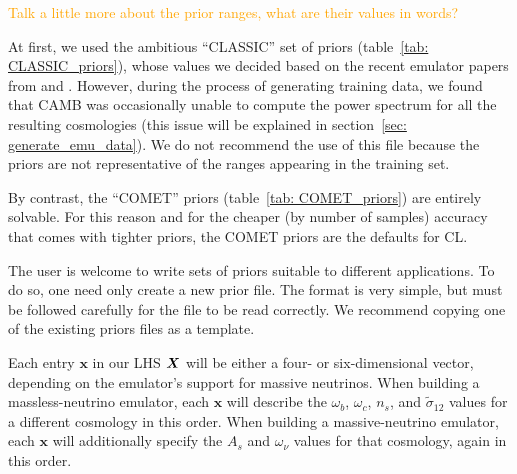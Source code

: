 \textcolor{orange}{Talk a little more about the prior ranges, what are their
values in words?}

At first, we used the ambitious ``CLASSIC'' set of priors
(table~\ref{tab: CLASSIC_priors}), whose values we decided based on the recent 
emulator papers from \citet{Mancini} and \citet{Arico}.
However, during the process of generating training data, 
we found that CAMB was occasionally unable to compute the power spectrum for
all the resulting cosmologies (this issue will be explained in
section~\ref{sec: generate_emu_data}). We do not recommend the use of this
file because the priors are not representative of the ranges appearing in the
training set.

By contrast, the ``COMET'' priors (table~\ref{tab: COMET_priors}) are 
entirely solvable. For this reason and for the cheaper (by number of samples) 
accuracy that comes with tighter priors, the COMET priors are the defaults for 
CL.

The user is welcome to write sets of priors suitable to different 
applications.
To do so, one need only create a new prior file. The format is very simple, 
but must be followed carefully for the file to be read correctly. We
recommend copying one of the existing priors files as a template. 

\begin{comment}
As one final note on the general implementation of LHSs in CL, we note that
all axes of our \textit{unit} LHSs run \textit{uniformly} over the interval
[0, 1]. However, the rescaled parameter domains can be more flexible. For 
example, the fourth axis of an LHS describes $\tilde{\sigma}_{12}$ in the 
default implementation of the code. We can also interpret the axis as a set of 
$\tilde{\sigma}_{12}^2$ values instead, in case we wish to
increase our sampling in larger values of $\tilde{\sigma}_{12}$ over the same
interval. Unfortunately, this non-uniform sampling does not seem to be
correctly implemented
in the current (as of 2 October 2023) version of the code. Nonetheless, as we
will repeat in section~\ref{sec: future_work},
the feature is in principle simple to implement.
\end{comment}

Each entry $\bm{x}$ in our LHS $\bm{X}$ will be either a four- or
six-dimensional vector, 
depending on the emulator's support for massive neutrinos. When building a
massless-neutrino emulator, each $\bm{x}$ will describe the $\omega_b$,
$\omega_c$, $n_s$, and
$\tilde{\sigma}_{12}$ values for a different cosmology in 
this order. When building a massive-neutrino emulator, each $\bm{x}$ will 
additionally specify the $A_s$ and $\omega_\nu$ values for that cosmology, 
again in this order.

